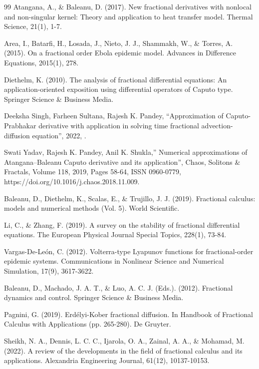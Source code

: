 \documentclass[10pt]{NSP1}
\begin{document}
\begin{thebibliography}{99}
Atangana, A., \& Baleanu, D. (2017). New fractional derivatives with nonlocal and non-singular kernel: Theory and application to heat transfer model. Thermal Science, 21(1), 1-7.

Area, I., Batarfi, H., Losada, J., Nieto, J. J., Shammakh, W., \& Torres, A. (2015). On a fractional order Ebola epidemic model. Advances in Difference Equations, 2015(1), 278.

Diethelm, K. (2010). The analysis of fractional differential equations: An application-oriented exposition using differential operators of Caputo type. Springer Science \& Business Media.

Deeksha Singh, Farheen Sultana, Rajesh K. Pandey, “Approximation of Caputo-Prabhakar derivative with application in solving time fractional advection-diffusion equation”, 2022, .

Swati Yadav, Rajesh K. Pandey, Anil K. Shukla,” Numerical approximations of Atangana–Baleanu Caputo derivative and its application”, Chaos, Solitons \& Fractals, Volume 118, 2019, Pages 58-64, ISSN 0960-0779, https://doi.org/10.1016/j.chaos.2018.11.009.

Baleanu, D., Diethelm, K., Scalas, E., \& Trujillo, J. J. (2019). Fractional calculus: models and numerical methods (Vol. 5). World Scientific.

Li, C., \& Zhang, F. (2019). A survey on the stability of fractional differential equations. The European Physical Journal Special Topics, 228(1), 73-84.

Vargas-De-León, C. (2012). Volterra-type Lyapunov functions for fractional-order epidemic systems. Communications in Nonlinear Science and Numerical Simulation, 17(9), 3617-3622.

Baleanu, D., Machado, J. A. T., \& Luo, A. C. J. (Eds.). (2012). Fractional dynamics and control. Springer Science \& Business Media.

Pagnini, G. (2019). Erdélyi-Kober fractional diffusion. In Handbook of Fractional Calculus with Applications (pp. 265-280). De Gruyter.

Sheikh, N. A., Dennis, L. C. C., Ijarola, O. A., Zainal, A. A., \& Mohamad, M. (2022). A review of the developments in the field of fractional calculus and its applications. Alexandria Engineering Journal, 61(12), 10137-10153.


\end{thebibliography}
\end{document}
